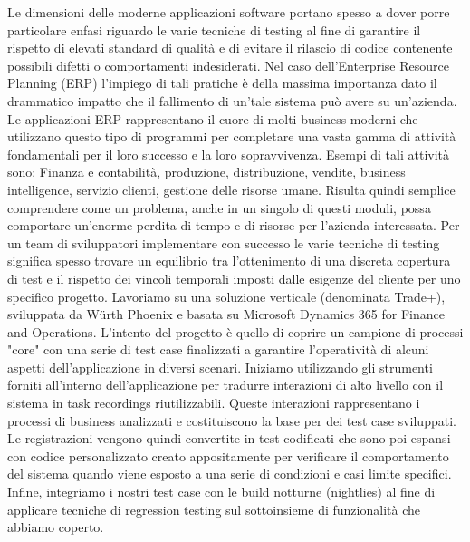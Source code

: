 Le dimensioni delle moderne applicazioni software portano spesso a dover porre particolare enfasi riguardo le varie tecniche di testing al fine di garantire il rispetto di elevati standard di qualità e di evitare il rilascio di codice contenente possibili difetti o comportamenti indesiderati. 
Nel caso dell'Enterprise Resource Planning (ERP) l'impiego di tali pratiche è della massima importanza dato il drammatico impatto che il fallimento di un'tale sistema può avere su un'azienda. 
Le applicazioni ERP rappresentano il cuore di molti business moderni che utilizzano questo tipo di programmi per completare una vasta gamma di attività fondamentali per il loro successo e la loro sopravvivenza. 
Esempi di tali attività sono: Finanza e contabilità, produzione, distribuzione, vendite, business intelligence, servizio clienti, gestione delle risorse umane. 
Risulta quindi semplice comprendere come un problema, anche in un singolo di questi moduli, possa comportare un'enorme perdita di tempo e di risorse per l'azienda interessata. 
Per un team di sviluppatori implementare con successo le varie tecniche di testing significa spesso trovare un equilibrio tra l'ottenimento di una discreta copertura di test e il rispetto dei vincoli temporali imposti dalle esigenze del cliente per uno specifico progetto. 
Lavoriamo su una soluzione verticale (denominata Trade+), sviluppata da Würth Phoenix e basata su Microsoft Dynamics 365 for Finance and Operations. L'intento del progetto è quello di coprire un campione di processi "core" con una serie di test case finalizzati a garantire l'operatività di alcuni aspetti dell'applicazione in diversi scenari. 
Iniziamo utilizzando gli strumenti forniti all'interno dell'applicazione per tradurre interazioni di alto livello con il sistema in task recordings riutilizzabili. 
Queste interazioni rappresentano i processi di business analizzati e costituiscono la base per dei test case sviluppati. 
Le registrazioni vengono quindi convertite in test codificati che sono poi espansi con codice personalizzato creato appositamente per verificare il comportamento del sistema quando viene esposto a una serie di condizioni e casi limite specifici. 
Infine, integriamo i nostri test case con le build notturne (nightlies) al fine di applicare tecniche di regression testing sul sottoinsieme di funzionalità che abbiamo coperto. 

